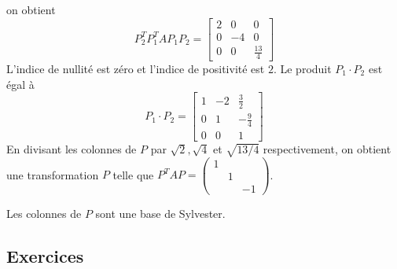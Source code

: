 \begin{example}
\begin{displaymath}
\end{displaymath}
on obtient 
\begin{displaymath}
  P_2^TP_1^T A P_1 P_2 = \left[\begin{matrix}2 & 0 & 0\\0 & -4 & 0\\0 & 0 & \frac{13}{4} \end{matrix}\right]
\end{displaymath}
L'indice de nullité est zéro et l'indice de positivité est $2$. Le produit $P_1\cdot P_2$ est égal à 
\begin{displaymath}
  P_1 \cdot P_2 = \left[\begin{matrix}1 & -2 & \frac{3}{2}\\0 & 1 & -\frac{9}{4}\\0 & 0 & 1\end{matrix}\right]
\end{displaymath}
En divisant les colonnes de $P$ par $\sqrt{2},\sqrt{4}$ et $\sqrt{13/4}$ respectivement, on obtient une transformation $P$ telle que $P^TAP =
\begin{pmatrix}
  1& \\
  & 1 & \\
  & & -1
\end{pmatrix}$. 
\end{example}
Les colonnes de $P$ sont une base de Sylvester. 



\subsection*{Exercices} 

